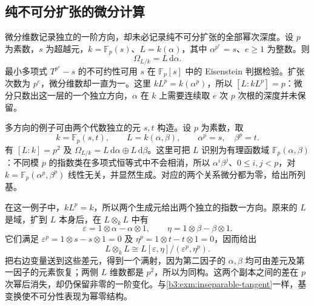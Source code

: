 \subsection{纯不可分扩张的微分计算}
\label{b3:subsec:1404:05}

微分维数记录独立的一阶方向，却未必记录纯不可分扩张的全部幂次深度。设 \(p\) 为素数，\(s\) 为超越元，\(k=\mathbb F_p(s)\)、\(L=k(\alpha)\)，其中 \(\alpha^{p^e}=s\)、\(e\ge1\) 为整数。则
\[
	\Omega_{L/k}=L\,\mathrm{d}\alpha.
\]
最小多项式 \(T^{p^e}-s\) 的不可约性可用 \(s\) 在 \(\mathbb F_p[s]\) 中的 Eisenstein 判据检验。扩张次数为 \(p^e\)，微分维数却一直为一。这里 \(kL^p=k(\alpha^p)\)，所以 \([L:kL^p]=p\)：微分只数出这一层的一个独立方向，\(\alpha\) 在 \(k\) 上需要连续取 \(e\) 次 \(p\) 次根的深度并未保留。

\ProseParagraphBreak

多方向的例子可由两个代数独立的元 \(s,t\) 构造。设 \(p\) 为素数，取
\[
	k=\mathbb F_p(s,t),\qquad L=k(\alpha,\beta),\qquad \alpha^p=s,\quad\beta^p=t.
\]
有 \([L:k]=p^2\) 及 \(\Omega_{L/k}=L\,\mathrm{d}\alpha\oplus L\,\mathrm{d}\beta\)。这里可把 \(L\) 识别为有理函数域 \(\mathbb F_p(\alpha,\beta)\)：不同模 \(p\) 的指数类在多项式恒等式中不会相消，所以 \(\alpha^i\beta^j\)、\(0\le i,j<p\)，对 \(k=\mathbb F_p(\alpha^p,\beta^p)\) 线性无关，并显然生成。对应的两个关系微分都为零，给出所列基。

\ProseParagraphBreak
在这一例子中，\(kL^p=k\)，所以两个生成元给出两个独立的指数一方向。原来的 \(L\) 是域，扩到 \(L\) 本身后，在 \(L\otimes_kL\) 中有
\[
	\varepsilon=1\otimes\alpha-\alpha\otimes1,\qquad \eta=1\otimes\beta-\beta\otimes1.
\]
它们满足 \(\varepsilon^p=1\otimes s-s\otimes1=0\) 及 \(\eta^p=1\otimes t-t\otimes1=0\)，因而给出
\[
	L\otimes_kL\cong L[\varepsilon,\eta]/(\varepsilon^p,\eta^p).
\]
把右边变量送到这些差元，得到一个满射，因为第二因子的 \(\alpha,\beta\) 均可由差元及第一因子的元素恢复；两侧 \(L\) 维数都是 \(p^2\)，所以为同构。这两个副本之间的差在 \(p\) 次幂后消失，却仍保留非零的一阶变化。与\cref{b3:exm:inseparable-tangent}一样，基变换使不可分性表现为幂零结构。
